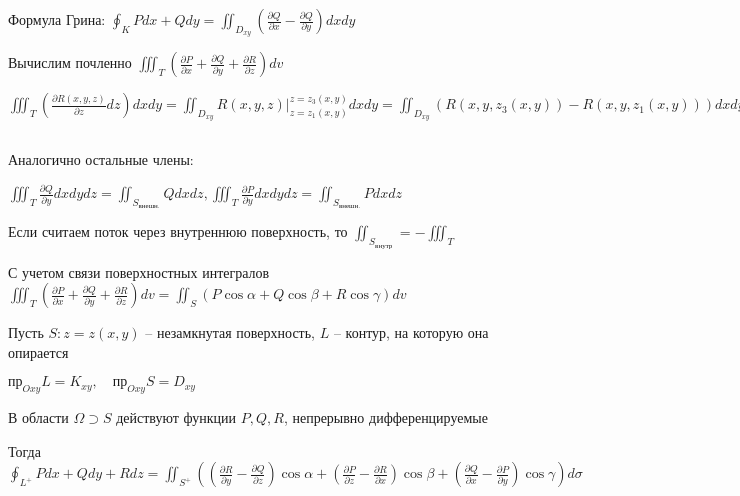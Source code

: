\documentclass[12pt]{article}
\begin{document}
    \Mem Формула Грина: $\oint_K Pdx + Qdy = \iint_{D_{xy}} \left(\frac{\partial Q}{\partial x} - \frac{\partial Q}{\partial y}\right) dxdy$

    \begin{MyProof}
        Вычислим почленно $\iiint_T \left(\frac{\partial P}{\partial x} + \frac{\partial Q}{\partial y} + \frac{\partial R}{\partial z}\right) dv$

        $\iiint_T \left(\frac{\partial R(x, y, z)}{\partial z} dz\right) dxdy = \iint_{D_{xy}} R(x, y, z) \Big|_{z = z_1 (x, y)}^{z = z_3(x, y)} dxdy = \iint_{D_{xy}} (R(x, y, z_3(x, y)) - R(x, y, z_1(x, y))) dxdy =
        \underset{\text{двойной}}{\iint_{D_{xy}} R(x, y, z_3) dxdy} - \iint_{D_{xy}} R(x, y, z_1(x, y)) dxdy = \underset{\text{поверхностный}}{\iint_{S_3} R(x, y, z) dxdy} + \iint_{S_1} R(x, y, z) dxdy +
        \underset{\text{равен } 0\text{, т.к. } dxdy\ |_{S_2} = 0}{\iint_{S_2} R(x, y, z) dxdy} = \iint_{S_{\text{внешн.}}} Rdxdy$

        \smallvspace

        Аналогично остальные члены:

        $\iiint_T \frac{\partial Q}{\partial y} dxdydz = \iint_{S_{\text{внешн.}}} Qdxdz, \iiint_T \frac{\partial P}{\partial y} dxdydz = \iint_{S_{\text{внешн.}}} Pdxdz$
    \end{MyProof}

    \Nota Если считаем поток через внутреннюю поверхность, то $\iint_{S_{\text{внутр}}} = - \iiint_T$

    \Nota С учетом связи поверхностных интегралов $\iiint_T \left(\frac{\partial P}{\partial x} + \frac{\partial Q}{\partial y} + \frac{\partial R}{\partial z}\right) dv =
    \iint_S (P\cos\alpha + Q\cos\beta + R\cos\gamma) dv$

    \hypertarget{theoremStokes}{}

    \begin{MyTheorem}

        Пусть $S : z = z(x, y)$ -- незамкнутая поверхность, $L$ -- контур, на которую она опирается

        $\text{пр}_{Oxy} L = K_{xy}, \quad \text{пр}_{Oxy} S = D_{xy}$

        В области $\Omega \supset S$ действуют функции $P, Q, R$, непрерывно дифференцируемые

        Тогда $\oint_{L^+} Pdx + Qdy + Rdz = \iint_{S^+} \left(\left(\frac{\partial R}{\partial y} - \frac{\partial Q}{\partial z}\right)\cos\alpha +
        \left(\frac{\partial P}{\partial z} - \frac{\partial R}{\partial x}\right)\cos\beta + \left(\frac{\partial Q}{\partial x} - \frac{\partial P}{\partial y}\right)\cos\gamma\right) d\sigma$
    \end{MyTheorem}
\end{document}
